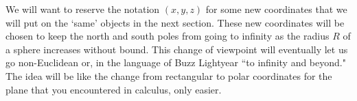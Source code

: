 We will want to reserve the notation $\left(  x,y,z\right)  $ for some new
coordinates that we will put on the `same' objects in the next section. These
new coordinates will be chosen to keep the north and south poles from going to
infinity as the radius $R$ of a sphere increases without bound. This change of
viewpoint will eventually let us go non-Euclidean or, in the language of Buzz
Lightyear \textquotedblleft to infinity and beyond." The idea will be like the
change from rectangular to polar coordinates for the plane that you
encountered in calculus, only easier. 
